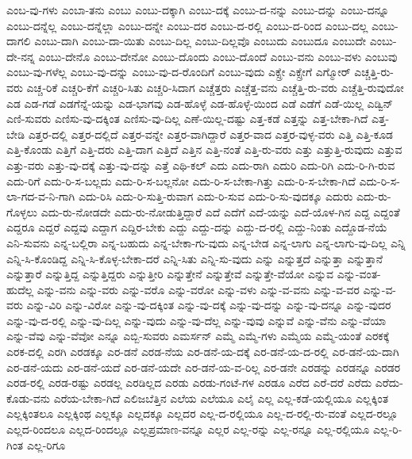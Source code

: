 {ಎಂಬ-ವು-ಗಳು
ಎಂಬಾ-ತನು
ಎಂಬು
ಎಂಬು-ದಕ್ಕಾಗಿ
ಎಂಬು-ದಕ್ಕೆ
ಎಂಬು-ದ-ನನ್ನು
ಎಂಬು-ದನ್ನು
ಎಂಬು-ದನ್ನೂ
ಎಂಬು-ದನ್ನೆಲ್ಲ
ಎಂಬು-ದನ್ನೆಲ್ಲಾ
ಎಂಬು-ದನ್ನೇ
ಎಂಬು-ದರ
ಎಂಬು-ದ-ರಲ್ಲಿ
ಎಂಬು-ದ-ರಿಂದ
ಎಂಬು-ದಲ್ಲ
ಎಂಬು-ದಾಗಲಿ
ಎಂಬು-ದಾಗಿ
ಎಂಬು-ದಾ-ಯಿತು
ಎಂಬು-ದಿಲ್ಲ
ಎಂಬು-ದಿಲ್ಲವೊ
ಎಂಬುದು
ಎಂಬುದೂ
ಎಂಬುದೇ
ಎಂಬು-ದೇ-ನನ್ನ
ಎಂಬು-ದೇನೊ
ಎಂಬು-ದೇನೋ
ಎಂಬು-ದೊಂದು
ಎಂಬು-ದೊಂದೆ
ಎಂಬು-ವನು
ಎಂಬು-ವಳು
ಎಂಬುವು
ಎಂಬು-ವು-ಗಳೆಲ್ಲ
ಎಂಬು-ವು-ದನ್ನು
ಎಂಬು-ವು-ದ-ರೊಂದಿಗೆ
ಎಂಬು-ವುದು
ಎಕ್ಸ್ರೇ
ಎಕ್ಸ್ರೇಗೆ
ಎಗ್ಮೋರ್
ಎಚ್ಚತ್ತಿ-ರು-ವರು
ಎಚ್ಚ-ರಿಕೆ
ಎಚ್ಚರಿ-ಕೆಗೆ
ಎಚ್ಚರಿ-ಸಿತು
ಎಚ್ಚರಿ-ಸಿದಾಗ
ಎಚ್ಚೆತ್ತರು
ಎಚ್ಚೆತ್ತ-ವನು
ಎಚ್ಚೆತ್ತಿ-ರು-ವರು
ಎಚ್ಚೆತ್ತಿ-ರುವುದೋ
ಎಡ
ಎಡ-ಗಡೆ
ಎಡಗೆನ್ನೆ-ಯನ್ನು
ಎಡ-ಭಾಗವು
ಎಡ-ಹೊಳ್ಳೆ
ಎಡ-ಹೊಳ್ಳೆ-ಯಿಂದ
ಎಡೆ
ಎಡೆಗೆ
ಎಡೆ-ಯಿಲ್ಲ
ಎಡ್ವಿನ್
ಎಣಿ-ಸುವರು
ಎಣಿಸು-ವು-ದಕ್ಕಿಂತ
ಎಣಿಸು-ವು-ದಿಲ್ಲ
ಎಣೆ-ಯಿಲ್ಲ-ದಷ್ಟು
ಎತ್ತ-ಕಡೆ
ಎತ್ತನ್ನು
ಎತ್ತ-ಬೇಕಾ-ಗಿದೆ
ಎತ್ತ-ಬೇಡಿ
ಎತ್ತರ-ದಲ್ಲಿ
ಎತ್ತರ-ದಲ್ಲಿದೆ
ಎತ್ತರ-ವನ್ನೇ
ಎತ್ತರ-ವಾಗಿದ್ದಾರೆ
ಎತ್ತರ-ವಾದ
ಎತ್ತರ-ವುಳ್ಳ-ವರು
ಎತ್ತಿ
ಎತ್ತಿ-ಕೂಡ
ಎತ್ತಿ-ಕೊಂಡು
ಎತ್ತಿಗೆ
ಎತ್ತಿ-ದರು
ಎತ್ತಿ-ದಾಗ
ಎತ್ತಿದೆ
ಎತ್ತಿನ
ಎತ್ತಿ-ನಂತೆ
ಎತ್ತಿ-ರು-ವರು
ಎತ್ತು
ಎತ್ತುತ್ತಿ-ರುವುದು
ಎತ್ತುವ
ಎತ್ತು-ವರು
ಎತ್ತು-ವು-ದಕ್ಕೆ
ಎತ್ತು-ವು-ದನ್ನು
ಎತ್ತೆ
ಎಥಿ-ಕಲ್
ಎದು
ಎದು-ರಾಗಿ
ಎದುರಿ
ಎದು-ರಿಗಿ
ಎದು-ರಿ-ಗಿ-ರುವ
ಎದು-ರಿಗೆ
ಎದು-ರಿ-ಸ-ಬಲ್ಲದು
ಎದು-ರಿ-ಸ-ಬಲ್ಲನೋ
ಎದು-ರಿ-ಸ-ಬೇಕಾ-ಗಿತ್ತು
ಎದು-ರಿ-ಸ-ಬೇಕಾ-ಗಿದೆ
ಎದು-ರಿ-ಸ-ಲಾ-ಗದ-ವ-ನಿ-ಗಾಗಿ
ಎದು-ರಿಸಿ
ಎದು-ರಿ-ಸುತ್ತಿ-ರುವಾಗ
ಎದು-ರಿ-ಸುವ
ಎದು-ರಿ-ಸು-ವುದಕ್ಕೂ
ಎದುರು
ಎದು-ರು-ಗೊಳ್ಳಲು
ಎದು-ರು-ನೋಡದೇ
ಎದು-ರು-ನೋಡುತ್ತಿದ್ದಾರೆ
ಎದೆ
ಎದೆಗೆ
ಎದೆ-ಯನ್ನು
ಎದೆ-ಯೊಳ-ಗಿನ
ಎದ್ದ
ಎದ್ದಂತೆ
ಎದ್ದರೂ
ಎದ್ದರೆ
ಎದ್ದವು
ಎದ್ದಾಗ
ಎದ್ದಿರ-ಬೇಕು
ಎದ್ದು
ಎದ್ದು-ದನ್ನು
ಎದ್ದು-ದ-ರಲ್ಲಿ
ಎದ್ದು-ನಿಂತು
ಎದ್ದೊಡ-ನೆಯೆ
ಎನಿ-ಸುವನು
ಎನ್ನ-ಬಲ್ಲಿರಾ
ಎನ್ನ-ಬಹುದು
ಎನ್ನ-ಬೇಕಾ-ಗು-ವುದು
ಎನ್ನ-ಬೇಡ
ಎನ್ನ-ಲಾಗು
ಎನ್ನ-ಲಾಗು-ವು-ದಿಲ್ಲ
ಎನ್ನಿ
ಎನ್ನಿ-ಸಿ-ಕೊಂಡಿದ್ದ
ಎನ್ನಿ-ಸಿ-ಕೊಳ್ಳ-ಬೇಕಾ-ದರೆ
ಎನ್ನಿ-ಸಿತು
ಎನ್ನಿ-ಸು-ವುದು
ಎನ್ನು
ಎನ್ನುತ್ತದೆ
ಎನ್ನುತ್ತಾ
ಎನ್ನುತ್ತಾನೆ
ಎನ್ನುತ್ತಾರೆ
ಎನ್ನುತ್ತಿದ್ದ
ಎನ್ನುತ್ತಿದ್ದರು
ಎನ್ನುತ್ತೀರಿ
ಎನ್ನುತ್ತೇನೆ
ಎನ್ನುತ್ತೇವೆ
ಎನ್ನುತ್ತೇ-ವೆಯೋ
ಎನ್ನುವ
ಎನ್ನು-ವಂತ-ಹುದೆಲ್ಲ
ಎನ್ನು-ವನು
ಎನ್ನು-ವರು
ಎನ್ನು-ವರೊ
ಎನ್ನು-ವರೋ
ಎನ್ನು-ವಳು
ಎನ್ನು-ವ-ವನು
ಎನ್ನು-ವ-ವರ
ಎನ್ನು-ವ-ವರು
ಎನ್ನು-ವಿರಿ
ಎನ್ನು-ವಿರೋ
ಎನ್ನು-ವು-ದಕ್ಕಿಂತ
ಎನ್ನು-ವು-ದಕ್ಕೆ
ಎನ್ನು-ವು-ದನ್ನು
ಎನ್ನು-ವು-ದನ್ನೂ
ಎನ್ನು-ವುದರ
ಎನ್ನು-ವು-ದ-ರಲ್ಲಿ
ಎನ್ನು-ವು-ದಿಲ್ಲ
ಎನ್ನು-ವುದು
ಎನ್ನು-ವು-ದೆಲ್ಲ
ಎನ್ನು-ವುವು
ಎನ್ನುವೆ
ಎನ್ನು-ವೆನು
ಎನ್ನು-ವೆಯಾ
ಎನ್ನು-ವೆವು
ಎನ್ನು-ವೆವೋ
ಎನ್ನೂ
ಎಬ್ಬಿ-ಸುವರು
ಎಮರ್ಸನ್
ಎಮ್ಮೆ
ಎಮ್ಮೆ-ಗಳು
ಎಮ್ಮೆಯ
ಎಮ್ಮೆ-ಯಂತೆ
ಎರಕಕ್ಕೆ
ಎರಕ-ದಲ್ಲಿ
ಎರಗಿ
ಎರಡಕ್ಕೂ
ಎರ-ಡನೆ
ಎರಡ-ನೆಯ
ಎರ-ಡನೆ-ಯ-ದಕ್ಕೆ
ಎರ-ಡನೆ-ಯ-ದ-ರಲ್ಲಿ
ಎರ-ಡನೆ-ಯ-ದಾಗಿ
ಎರ-ಡನೆ-ಯದು
ಎರ-ಡನೆ-ಯದೆ
ಎರ-ಡನೆ-ಯದೇ
ಎರ-ಡನೆ-ಯ-ವ-ರಿಲ್ಲ
ಎರ-ಡನೇ
ಎರಡನ್ನು
ಎರಡನ್ನೂ
ಎರಡರ
ಎರಡ-ರಲ್ಲಿ
ಎರಡ-ರಷ್ಟು
ಎರಡಲ್ಲ
ಎರಡಿಲ್ಲದ
ಎರಡು
ಎರಡು-ಗಂಟೆ-ಗಳ
ಎರಡೂ
ಎರೆದ
ಎರೆ-ದರೆ
ಎರೆದು
ಎರೆದು-ಕೊಡು-ವನು
ಎರೆಯ-ಬೇಕಾ-ಗಿದೆ
ಎಲಿಜಬೆತ್ತಿನ
ಎಲೆಯ
ಎಲೆಯೂ
ಎಲೈ
ಎಲ್ಲ
ಎಲ್ಲ-ಕಡೆ-ಯಲ್ಲಿಯೂ
ಎಲ್ಲಕ್ಕಿಂತ
ಎಲ್ಲಕ್ಕಿಂತಲೂ
ಎಲ್ಲಕ್ಕಿಂಥ
ಎಲ್ಲಕ್ಕೂ
ಎಲ್ಲದಕ್ಕೂ
ಎಲ್ಲದರ
ಎಲ್ಲ-ದ-ರಲ್ಲಿಯೂ
ಎಲ್ಲ-ದ-ರಲ್ಲಿ-ರು-ವಂತೆ
ಎಲ್ಲದ-ರಲ್ಲೂ
ಎಲ್ಲದ-ರಿಂದಲೂ
ಎಲ್ಲದ-ರಿಂದಲ್ಲೂ
ಎಲ್ಲಪ್ರಮಾಣ-ವನ್ನೂ
ಎಲ್ಲರ
ಎಲ್ಲ-ರನ್ನು
ಎಲ್ಲ-ರನ್ನೂ
ಎಲ್ಲ-ರಲ್ಲಿಯೂ
ಎಲ್ಲ-ರಿ-ಗಿಂತ
ಎಲ್ಲ-ರಿಗೂ
}
